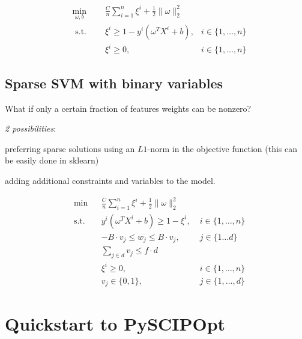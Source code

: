 \documentclass[12pt]{article}
\begin{document}
$$
\begin{aligned}
  & \min\limits_{\omega, b}
  & & \frac{C}{n} \sum\limits_{i = 1}^{n} \xi^{i} + \frac{1}{2} \lVert \omega \rVert_{2}^{2}\\
  & \text{ s.t. }\;
  & &  \xi^{i} \geq 1 - y^{i} (\omega^{T} X^{i} +b), &  i \in \{1,\dots,n\}\\
  & & & \xi^{i} \geq 0, & i \in \{1,\dots, n\}
\end{aligned}
$$

\subsection*{Sparse SVM with binary variables}

What if only a certain fraction of features weights can be nonzero?

\emph{2 possibilities}:
\begin{compactitem}[$\circ$]
  \item preferring sparse solutions using an $L1$-norm in the objective function (this can be easily done in sklearn)
  \item adding additional constraints and variables to the model.
\end{compactitem}
\begin{equation*}
  \begin{aligned}
    & \min
    & & \frac{C}{n} \sum\limits_{i = 1}^{n} \xi^{i} + \frac{1}{2} \lVert \omega \rVert_{2}^{2}\\
    & \text{s.t.}
    & & y^{i} (\omega^{T} X^{i} + b) \geq 1 - \xi^{i}, \; & i \in \{1,\dots,n\}\\
    & & & -B \cdot v_{j} \leq w_{j} \leq B \cdot v_{j}, \; & j \in \{ 1 \dots d \}\\
    & & & \sum_{j \in d} v_{j} \leq f \cdot d\\
    & & & \xi^{i} \geq 0, \; & i \in \{1, \dots, n\} \\
    & & & v_{j} \in \{0,1\}, & j \in \{1,\dots, d\}
  \end{aligned}
\end{equation*}











\section*{Quickstart to PySCIPOpt}
\end{document}
